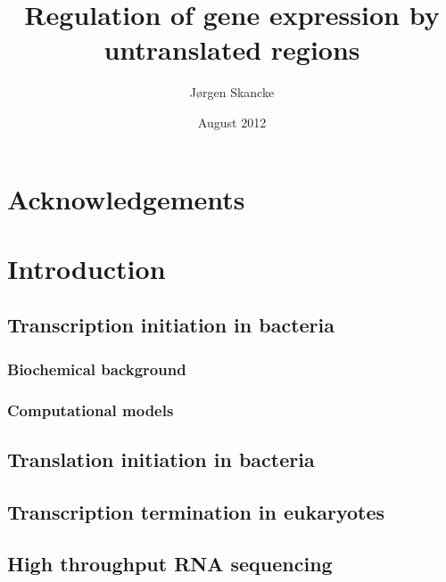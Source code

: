 \documentclass[]{ntnuthesis}
\title{Regulation of gene expression by untranslated regions}
\author{J\o rgen Skancke}
\date{August 2012}
\begin{document}
 

\frontmatter

\maketitle

\chapter*{Acknowledgements}



\mainmatter

\chapter{Introduction}



\section{Transcription initiation in bacteria}
\subsection{Biochemical background}

\subsection{Computational models}


\section{Translation initiation in bacteria}


\section{Transcription termination in eukaryotes}

\section{High throughput RNA sequencing}

\end{document}

